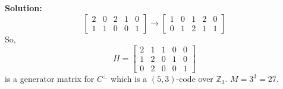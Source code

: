 \begin{exbox}
\begin{example}
    \textbf{Solution:}
    \[\begin{bmatrix}
            2 & 0 & 2 & 1 & 0 \\
            1 & 1 & 0 & 0 & 1
        \end{bmatrix}\rightarrow
        \begin{bmatrix}
            1 & 0 & 1 & 2 & 0 \\
            0 & 1 & 2 & 1 & 1
        \end{bmatrix}\]
    So,
    \[ H=
        \left[\begin{array}{cc|ccc}
                2 & 1 & 1 & 0 & 0 \\
                1 & 2 & 0 & 1 & 0 \\
                0 & 2 & 0 & 0 & 1
            \end{array}\right] \]
    is a generator matrix for $ C^{\perp} $ which is a $ (5,3) $-code
    over $ \mathbb{Z}_3 $. $ M=3^3=27 $.
        \end{example}
\end{exbox}